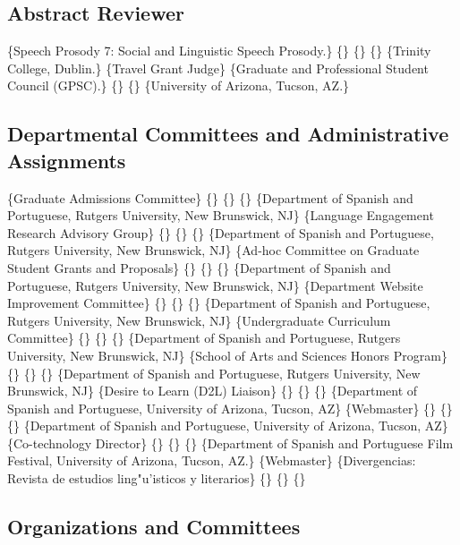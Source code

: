 \documentclass[11pt,letterpaper]{moderncv}
\begin{document}
\subsection{Abstract Reviewer}


\{Speech Prosody 7: Social and Linguistic Speech Prosody.\} \{\} \{\}
\{\} \{Trinity College, Dublin.\}  \{Travel Grant Judge\}
\{Graduate and Professional Student Council (GPSC).\} \{\} \{\}
\{University of Arizona, Tucson, AZ.\}

\subsection{Departmental Committees and Administrative Assignments}


\{Graduate Admissions Committee\} \{\} \{\} \{\} \{Department of Spanish
and Portuguese, Rutgers University, New Brunswick, NJ\}
 \{Language Engagement Research Advisory
Group\} \{\} \{\} \{\} \{Department of Spanish and Portuguese, Rutgers
University, New Brunswick, NJ\}  \{Ad-hoc
Committee on Graduate Student Grants and Proposals\} \{\} \{\} \{\}
\{Department of Spanish and Portuguese, Rutgers University, New
Brunswick, NJ\}  \{Department Website Improvement
Committee\} \{\} \{\} \{\} \{Department of Spanish and Portuguese,
Rutgers University, New Brunswick, NJ\} 
\{Undergraduate Curriculum Committee\} \{\} \{\} \{\} \{Department of
Spanish and Portuguese, Rutgers University, New Brunswick, NJ\}
 \{School of Arts and Sciences Honors Program\}
\{\} \{\} \{\} \{Department of Spanish and Portuguese, Rutgers
University, New Brunswick, NJ\}  \{Desire to Learn
(D2L) Liaison\} \{\} \{\} \{\} \{Department of Spanish and Portuguese,
University of Arizona, Tucson, AZ\}  \{Webmaster\}
\{\} \{\} \{\} \{Department of Spanish and Portuguese, University of
Arizona, Tucson, AZ\}  \{Co-technology Director\}
\{\} \{\} \{\} \{Department of Spanish and Portuguese Film Festival,
University of Arizona, Tucson, AZ.\} 
\{Webmaster\} \{Divergencias: Revista de estudios ling"u'isticos y
literarios\} \{\} \{\} \{\}

\subsection{Organizations and Committees}
\end{document}
